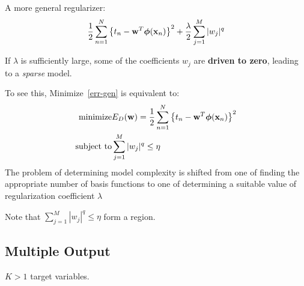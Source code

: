 \vspace{1cm}

A more general regularizer:
\begin{equation}
    \frac{1}{2} \sum_{n=1}^N {\left\{ t_n - \mathbf{w}^T\boldsymbol\phi(\mathbf{x}_n) \right\}}^2
    + \frac{\lambda}{2}\sum_{j=1}^M|w_j|^q
    \label{err-gen}
\end{equation}

If $\lambda$ is sufficiently large, some of the coefficients $w_j$ are
\textbf{driven to zero}, leading to a \emph{sparse} model.

To see this, Minimize~\ref{err-gen} is equivalent to:
\begin{align}
    \mbox{minimize} & E_D(\mathbf{w}) = \frac{1}{2}\sum_{n=1}^N{\left\{ t_n -
        \mathbf{w}^T\boldsymbol\phi(\mathbf{x}_n)
    \right\}}^2 \\
    \mbox{subject to} & \sum_{j=1}^M |w_j|^q \leq \eta
\end{align}
The problem of determining model complexity is shifted from one of finding
the appropriate number of basis functions to one of determining a suitable
value of regularization coefficient $\lambda$

Note that $\sum_{j=1}^M |w_j|^q \leq \eta$ form a region.

\subsection{Multiple Output}
$K > 1$ target variables.


